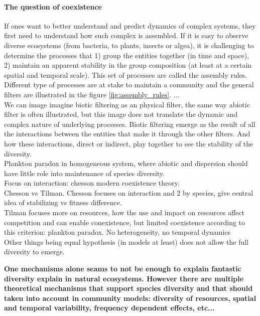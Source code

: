\paragraph{The question of coexistence}
If ones want to better understand and predict dynamics of complex systems, they first need to understand how such complex is assembled. If it is easy to observe diverse ecosystems (from bacteria, to plants, insects or algea), it is challenging to determine the processes that 1) group the entities together (in time and space), 2) maintain an apparent stability in the group composition (at least at a certain spatial and temporal scale). This set of processes are called the assembly rules. Different type of processes are at stake to maintain a community and the general filters are illustrated in the figure \ref{fig:assembly_rules}. ...\\
We can image imagine biotic filtering as an physical filter, the same way abiotic filter is often illustrated, but this image does not translate the dynamic and complex nature of underlying processes. Biotic filtering emerge as the result of all the interactions between the entities that make it through the other filters. And how these interactions, direct or indirect, play together to see the stability of the diversity.\\
Plankton paradox in homogeneous system, where abiotic and dispersion should have little role into maintenance of species diversity.\\
																			
Focus on interaction: chesson modern coexistence theory.\\

Chesson vs Tilman. 
Chesson focuses on interaction and 2 by species, give central idea of stabilizing vs fitness difference.\\
Tilman focuses more on resources, how the use and impact on resources affect competition and can enable conexistence, but limited coexistence according to this criterion: plankton paradox. No heterogeneity, no temporal dynamics\\

Other things being equal hypothesis (in models at least) does not allow the full diversity to emerge.\\

\parencite{clark_resolving_2007}

\textbf{One mechanisms alone seams to not be enough to explain fantastic diversity explain in natural ecosystems. However there are multiple theoretical mechanisms that support species diversity and that should taken into account in community models: diversity of resources, spatial and temporal variability, frequency dependent effects, etc...}


